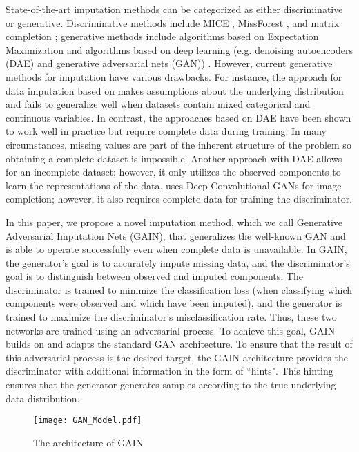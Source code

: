 \documentclass{article}
\begin{document}
State-of-the-art imputation methods can be categorized as either discriminative or generative. Discriminative methods include MICE \cite{MICE,MICE-R}, MissForest \cite{missforest}, and matrix completion \cite{Mat-0,Mat-1,Mat-2,Mat-3}; generative methods include algorithms based on Expectation Maximization \cite{EM} and algorithms based on deep learning (e.g. denoising autoencoders (DAE) and generative adversarial nets (GAN)) \cite{DAE,autoencoder,GAN-imagecomplete}. However, current generative methods for imputation have various drawbacks. For instance, the approach for data imputation based on \cite{EM} makes assumptions about the underlying distribution and fails to generalize well when datasets contain mixed categorical and continuous variables. In contrast, the approaches based on DAE \cite{DAE} have been shown to work well in practice but require complete data during training. In many circumstances, missing values are part of the inherent structure of the problem so obtaining a complete dataset is impossible. Another approach with DAE \cite{autoencoder} allows for an incomplete dataset; however, it only utilizes the observed components to learn the representations of the data. \cite{GAN-imagecomplete} uses Deep Convolutional GANs for image completion; however, it also requires complete data for training the discriminator.

In this paper, we propose a novel imputation method, which we call Generative Adversarial Imputation Nets (GAIN), that generalizes the well-known GAN \cite{GAN} and is able to operate successfully even when complete data is unavailable. In GAIN, the generator's goal is to accurately impute missing data, and the discriminator's goal is to distinguish between observed and imputed components. The discriminator is trained to minimize the classification loss (when classifying which components were observed and which have been imputed), and the generator is trained to maximize the discriminator's misclassification rate. Thus, these two networks are trained using an adversarial process. To achieve this goal, GAIN builds on and adapts the standard GAN architecture. To ensure that the result of this adversarial process is the desired target, the GAIN architecture provides the discriminator with additional information in the form of ``hints". This hinting ensures that the generator generates samples according to the true underlying data distribution.

    \begin{figure}[t!]
        \centering
        \texttt{[image: GAN\_Model.pdf]}
        \caption{The architecture of GAIN}
        \label{fig:model}
    \end{figure}
    
\end{document}
